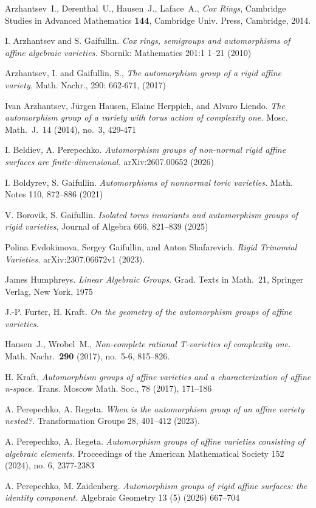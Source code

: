 \documentclass[a4paper,reqno,12pt]{amsart}
\theoremstyle{theorem}
\theoremstyle{definition}
\theoremstyle{theorem}
\theoremstyle{remark}
\newcommand{\0}{\circ}
\begin{document}
\begin{thebibliography}{}
     Arzhantsev~I., Derenthal~U., Hausen~J., Laface~A., \textit{Cox Rings}, Cambridge Studies in Advanced Mathematics {\bf 144}, Cambridge Univ. Press, Cambridge, 2014.

     I. Arzhantsev and S. Gaifullin. \emph{Cox rings, semigroups and automorphisms of affine algebraic varieties.} Sbornik: Mathematics 201:1 1–21 (2010)
    
     Arzhantsev, I. and Gaifullin, S., \emph{The automorphism group of a rigid affine variety.} Math. Nachr., 290: 662-671, (2017)

    

     Ivan Arzhantsev, J\"urgen Hausen, Elaine Herppich, and Alvaro Liendo. \emph{The automorphism group of a variety with torus action of complexity one.} Mosc. Math.~J.~14 (2014), no.~3, 429-471

     I. Beldiev, A. Perepechko. \textit{Automorphism groups of non-normal rigid affine surfaces are finite-dimensional.} arXiv:2607.00652 (2026)

     I. Boldyrev, S. Gaifullin. \emph{Automorphisms of nonnormal toric varieties.} Math. Notes 110, 872--886 (2021) 

     V. Borovik, S. Gaifullin. \emph{Isolated torus invariants and automorphism groups of rigid varieties},
Journal of Algebra 666, 821--839 (2025)

     Polina Evdokimova, Sergey Gaifullin, and Anton Shafarevich. {\it Rigid Trinomial Varieties.} arXiv:2307.06672v1 (2023).

     James Humphreys. \emph{Linear Algebraic Groups}. Grad. Texts in Math.~21, Springer Verlag, New York, 1975

     J.-P. Furter, H. Kraft. \emph{On the geometry of the automorphism groups of affine varieties.}


    Hausen~J., Wrobel~M., \emph{Non-complete rational T-varieties of complexity one.} Math. Nachr.~{\bf 290} (2017), no.~5-6, 815--826.

     H. Kraft, \textit{Automorphism groups of affine varieties and a characterization of affine n-space.} Trans. Moscow Math. Soc., 78 (2017), 171–186

     A. Perepechko, A. Regeta. \emph{When is the automorphism group of an affine variety nested?.} Transformation Groups 28, 401–412 (2023).

     A. Perepechko, A. Regeta. \emph{Automorphism groups of affine varieties consisting of algebraic elements.} Proceedings of the American Mathematical Society 152 (2024), no. 6, 2377-2383

     A. Perepechko, M. Zaidenberg. \textit{Automorphism groups of rigid affine surfaces: the identity component.} Algebraic Geometry 13 (5) (2026) 667–704
\end{thebibliography}
\end{document}
